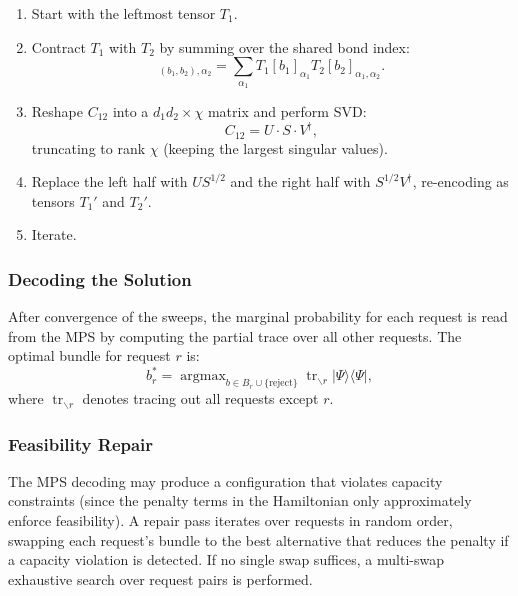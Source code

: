 \documentclass[10pt,a4paper]{article}
\newcommand{\tr}{\operatorname{tr}}
\newcommand{\argmax}{\operatorname{argmax}}
\begin{document}
\begin{enumerate}
  \item Start with the leftmost tensor $T_1$.
  \item Contract $T_1$ with $T_2$ by summing over the shared bond
    index:
    \begin{equation}
      [C_{12}]_{(b_1,b_2), \alpha_2}
        = \sum_{\alpha_1} T_1[b_1]_{\alpha_1} T_2[b_2]_{\alpha_1, \alpha_2}.
    \end{equation}
  \item Reshape $C_{12}$ into a $d_1 d_2 \times \chi$ matrix and
    perform SVD:
    \begin{equation}
      C_{12} = U \cdot S \cdot V^\dagger,
    \end{equation}
    truncating to rank $\chi$ (keeping the largest singular values).
  \item Replace the left half with $U S^{1/2}$ and the right half with
    $S^{1/2} V^\dagger$, re-encoding as tensors $T_1'$ and $T_2'$.
  \item Iterate.
\end{enumerate}

\subsubsection{Decoding the Solution}

After convergence of the sweeps, the marginal probability for each
request is read from the MPS by computing the partial trace over all
other requests.  The optimal bundle for request $r$ is:
\begin{equation}
  b_r^* = \argmax_{b \in B_r \cup \{\text{reject}\}}
    \tr_{\backslash r} |\Psi\rangle\langle\Psi|,
\end{equation}
where $\tr_{\backslash r}$ denotes tracing out all requests except $r$.

\subsubsection{Feasibility Repair}

The MPS decoding may produce a configuration that violates capacity
constraints (since the penalty terms in the Hamiltonian only
approximately enforce feasibility).  A repair pass iterates over
requests in random order, swapping each request's bundle to the best
alternative that reduces the penalty if a capacity violation is
detected.  If no single swap suffices, a multi-swap exhaustive search
over request pairs is performed.
\end{document}
